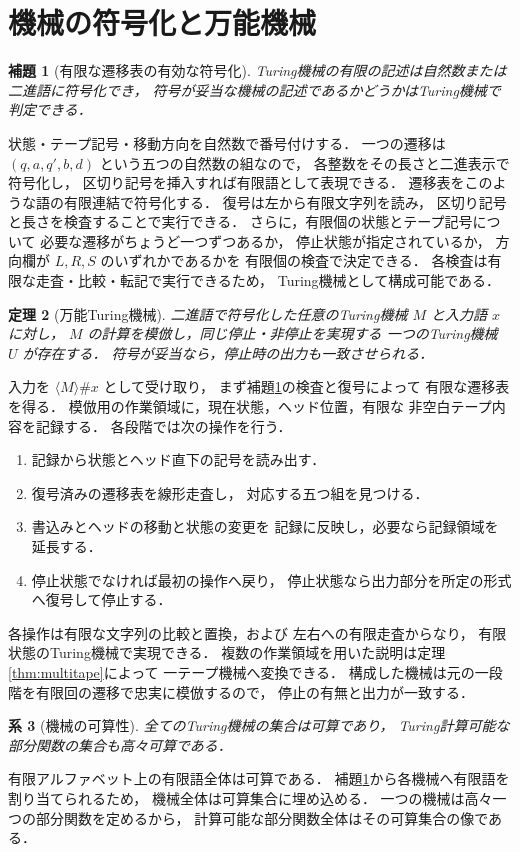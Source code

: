 \documentclass[a5paper,10pt,onecolumn]{jsarticle}
\makeatletter
\theoremstyle{mathnotetheorem}
\newtheorem{theorem}{定理}[section]
\newtheorem{lemma}[theorem]{補題}
\newtheorem{corollary}[theorem]{系}
\renewcommand{\proofname}{証明}
\renewenvironment{proof}[1][\proofname]{%
  \par\pushQED{\qed}\normalfont\topsep4\p@\@plus2\p@\relax
  \trivlist\item[\hskip\labelsep\bfseries #1]\ignorespaces
}{\popQED\endtrivlist\@endpefalse}
\makeatother
\begin{document}
\section{機械の符号化と万能機械}
\begin{lemma}[有限な遷移表の有効な符号化]\label{lem:coding}
Turing機械の有限の記述は自然数または二進語に符号化でき，
符号が妥当な機械の記述であるかどうかはTuring機械で判定できる．
\end{lemma}
\begin{proof}
状態・テープ記号・移動方向を自然数で番号付けする．
一つの遷移は
$(q,a,q',b,d)$ という五つの自然数の組なので，
各整数をその長さと二進表示で符号化し，
区切り記号を挿入すれば有限語として表現できる．
遷移表をこのような語の有限連結で符号化する．
復号は左から有限文字列を読み，
区切り記号と長さを検査することで実行できる．
さらに，有限個の状態とテープ記号について
必要な遷移がちょうど一つずつあるか，
停止状態が指定されているか，
方向欄が $L,R,S$ のいずれかであるかを
有限個の検査で決定できる．
各検査は有限な走査・比較・転記で実行できるため，
Turing機械として構成可能である．
\end{proof}
\begin{theorem}[万能Turing機械]\label{thm:universal}
二進語で符号化した任意のTuring機械 $M$ と入力語 $x$ に対し，
$M$ の計算を模倣し，同じ停止・非停止を実現する
一つのTuring機械 $U$ が存在する．
符号が妥当なら，停止時の出力も一致させられる．
\end{theorem}
\begin{proof}
入力を $\langle M\rangle\#x$ として受け取り，
まず補題\ref{lem:coding}の検査と復号によって
有限な遷移表を得る．
模倣用の作業領域に，現在状態，ヘッド位置，有限な
非空白テープ内容を記録する．
各段階では次の操作を行う．
\begin{enumerate}
\item 記録から状態とヘッド直下の記号を読み出す．
\item 復号済みの遷移表を線形走査し，
 対応する五つ組を見つける．
\item 書込みとヘッドの移動と状態の変更を
 記録に反映し，必要なら記録領域を延長する．
\item 停止状態でなければ最初の操作へ戻り，
 停止状態なら出力部分を所定の形式へ復号して停止する．
\end{enumerate}
各操作は有限な文字列の比較と置換，および
左右への有限走査からなり，
有限状態のTuring機械で実現できる．
複数の作業領域を用いた説明は定理\ref{thm:multitape}によって
一テープ機械へ変換できる．
構成した機械は元の一段階を有限回の遷移で忠実に模倣するので，
停止の有無と出力が一致する．
\end{proof}
\begin{corollary}[機械の可算性]
全てのTuring機械の集合は可算であり，
Turing計算可能な部分関数の集合も高々可算である．
\end{corollary}
\begin{proof}
有限アルファベット上の有限語全体は可算である．
補題\ref{lem:coding}から各機械へ有限語を割り当てられるため，
機械全体は可算集合に埋め込める．
一つの機械は高々一つの部分関数を定めるから，
計算可能な部分関数全体はその可算集合の像である．
\end{proof}
\end{document}
